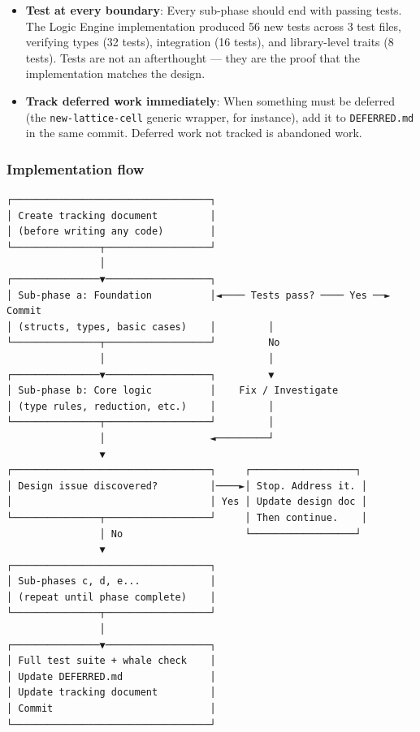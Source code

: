 \documentclass[11pt]{article}
\begin{document}
\begin{itemize}
Each sub-phase has a clear scope, produces testable artifacts, and
creates a natural commit point.

\item \textbf{Test at every boundary}: Every sub-phase should end with passing
tests. The Logic Engine implementation produced 56 new tests across
3 test files, verifying types (32 tests), integration (16 tests),
and library-level traits (8 tests). Tests are not an afterthought
--- they are the proof that the implementation matches the design.

\item \textbf{Track deferred work immediately}: When something must be deferred
(the \texttt{new-lattice-cell} generic wrapper, for instance), add it to
\texttt{DEFERRED.md} in the same commit. Deferred work not tracked is
abandoned work.
\end{itemize}
\subsubsection{Implementation flow}
\label{sec:org27d9960}

\begin{verbatim}
┌──────────────────────────────────┐
│ Create tracking document         │
│ (before writing any code)        │
└───────────────┬──────────────────┘
                │
┌───────────────▼──────────────────┐
│ Sub-phase a: Foundation          │◄──── Tests pass? ──── Yes ──► Commit
│ (structs, types, basic cases)    │         │
└───────────────┬──────────────────┘         No
                │                            │
┌───────────────▼──────────────────┐         ▼
│ Sub-phase b: Core logic          │    Fix / Investigate
│ (type rules, reduction, etc.)    │         │
└───────────────┬──────────────────┘         │
                │                  ◄─────────┘
                ▼
┌──────────────────────────────────┐     ┌──────────────────┐
│ Design issue discovered?         │────►│ Stop. Address it. │
│                                  │ Yes │ Update design doc │
└───────────────┬──────────────────┘     │ Then continue.    │
                │ No                     └──────────────────┘
                ▼
┌──────────────────────────────────┐
│ Sub-phases c, d, e...            │
│ (repeat until phase complete)    │
└───────────────┬──────────────────┘
                │
┌───────────────▼──────────────────┐
│ Full test suite + whale check    │
│ Update DEFERRED.md               │
│ Update tracking document         │
│ Commit                           │
└──────────────────────────────────┘
\end{verbatim}
\end{document}
